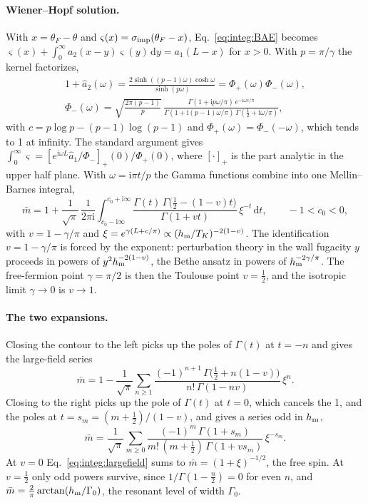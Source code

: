 \documentclass[11pt,a4paper]{article}
\numberwithin{equation}{section}
\newcommand{\dd}{\,\mathrm d}
\begin{document}
\paragraph{Wiener--Hopf solution.} With $x=\theta_F-\theta$ and $\varsigma(x)=\sigma_{\rm imp}(\theta_F-x)$,
Eq.~\eqref{eq:integ:BAE} becomes $\varsigma(x)+\int_0^\infty a_2(x-y)\varsigma(y)\dd y=a_1(L-x)$ for $x>0$. With
$p=\pi/\gamma$ the kernel factorizes,
\begin{equation}
\begin{gathered}
 1+\hat a_2(\omega)=\frac{2\sinh((p-1)\omega)\cosh\omega}{\sinh(p\omega)}=\Phi_+(\omega)\Phi_-(\omega),\\
 \Phi_-(\omega)=\sqrt{\frac{2\pi(p-1)}{p}}\,
 \frac{\Gamma(1+\mathrm ip\omega/\pi)\,e^{-\mathrm i\omega c/\pi}}{\Gamma(1+\mathrm i(p-1)\omega/\pi)\,
 \Gamma(\frac12+\mathrm i\omega/\pi)},
\end{gathered}
\end{equation}
with $c=p\log p-(p-1)\log(p-1)$ and $\Phi_+(\omega)=\Phi_-(-\omega)$, which tends to 1 at infinity. The standard
argument gives $\int_0^\infty\varsigma=[e^{\mathrm i\omega L}\hat a_1/\Phi_-]_+(0)/\Phi_+(0)$, where $[\cdot]_+$ is
the part analytic in the upper half plane. With $\omega=\mathrm i\pi t/p$ the Gamma functions combine into one
Mellin--Barnes integral,
\begin{equation}
 \bar m=1+\frac1{\sqrt\pi}\,\frac1{2\pi\mathrm i}\int_{c_0-\mathrm i\infty}^{c_0+\mathrm i\infty}
 \frac{\Gamma(t)\,\Gamma\bigl(\frac12-(1-v)t\bigr)}{\Gamma(1+vt)}\,\xi^{-t}\dd t,\qquad -1<c_0<0,
 \label{eq:integ:MB}
\end{equation}
with $v=1-\gamma/\pi$ and $\xi=e^{\gamma(L+c/\pi)}\propto(h_{\rm m}/T_K)^{-2(1-v)}$. The identification
$v=1-\gamma/\pi$ is forced by the exponent: perturbation theory in the wall fugacity $y$ proceeds in powers of
$y^2h_{\rm m}^{-2(1-v)}$, the Bethe ansatz in powers of $h_{\rm m}^{-2\gamma/\pi}$. The free-fermion point
$\gamma=\pi/2$ is then the Toulouse point $v=\frac12$, and the isotropic limit $\gamma\to0$ is $v\to1$.

\paragraph{The two expansions.} Closing the contour to the left picks up the poles of $\Gamma(t)$ at $t=-n$ and gives
the large-field series
\begin{equation}
 \bar m=1-\frac1{\sqrt\pi}\sum_{n\ge1}\frac{(-1)^{n+1}\,\Gamma\bigl(\frac12+n(1-v)\bigr)}{n!\,\Gamma(1-nv)}\,\xi^n .
 \label{eq:integ:largefield}
\end{equation}
Closing to the right picks up the pole of $\Gamma(t)$ at $t=0$, which cancels the 1, and the poles at
$t=s_m=(m+\frac12)/(1-v)$, and gives a series odd in $h_{\rm m}$,
\begin{equation}
 \bar m=\frac1{\sqrt\pi}\sum_{m\ge0}\frac{(-1)^m\,\Gamma(1+s_m)}{m!\,(m+\frac12)\,\Gamma(1+vs_m)}\,\xi^{-s_m}.
\end{equation}
At $v=0$ Eq.~\eqref{eq:integ:largefield} sums to $\bar m=(1+\xi)^{-1/2}$, the free spin. At $v=\frac12$ only odd
powers survive, since $1/\Gamma(1-\frac n2)=0$ for even $n$, and $\bar m=\frac2\pi\arctan(h_{\rm m}/\Gamma_0)$, the
resonant level of width $\Gamma_0$.
\end{document}
